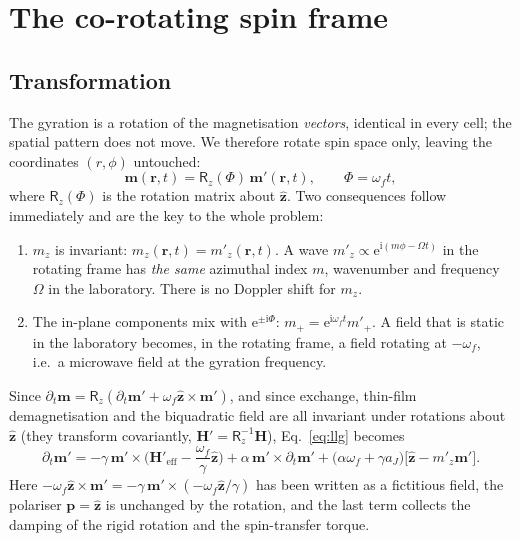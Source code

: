 \documentclass[11pt,a4paper]{article}
\newcommand{\vect}[1]{\mathbf{#1}}
\newcommand{\uv}[1]{\hat{\mathbf{#1}}}
\newcommand{\ee}{\mathrm{e}}
\newcommand{\ii}{\mathrm{i}}
\begin{document}
\section{The co-rotating spin frame}
\label{sec:frame}

\subsection{Transformation}
The gyration is a rotation of the magnetisation \emph{vectors}, identical in every cell; the spatial pattern does
not move.  We therefore rotate spin space only, leaving the coordinates $(r,\phi)$ untouched:
\begin{equation}
\vect m(\vect r,t)=\mathsf R_z(\Phi)\,\vect m'(\vect r,t),\qquad \Phi=\omega_f t,
\label{eq:rot}
\end{equation}
where $\mathsf R_z(\Phi)$ is the rotation matrix about $\uv z$.  Two consequences follow immediately and are the key
to the whole problem:
\begin{enumerate}
\item $m_z$ is invariant: $m_z(\vect r,t)=m'_z(\vect r,t)$.  A wave $m'_z\propto\ee^{\ii(m\phi-\Omega t)}$ in the
rotating frame has \emph{the same} azimuthal index $m$, wavenumber and frequency $\Omega$ in the laboratory.
There is no Doppler shift for $m_z$.
\item The in-plane components mix with $\ee^{\pm\ii\Phi}$: $m_+=\ee^{\ii\omega_f t}m'_+$.  A field that is static in
the laboratory becomes, in the rotating frame, a field rotating at $-\omega_f$, i.e.\ a microwave field at the
gyration frequency.
\end{enumerate}

Since $\partial_t\vect m=\mathsf R_z(\partial_t\vect m'+\omega_f\uv z\times\vect m')$, and since exchange,
thin-film demagnetisation and the biquadratic field are all invariant under rotations about $\uv z$
(they transform covariantly, $\vect H'=\mathsf R_z^{-1}\vect H$), Eq.~\eqref{eq:llg} becomes
\begin{equation}
\partial_t\vect m'=-\gamma\,\vect m'\times\Big(\vect H'_\mathrm{eff}-\frac{\omega_f}{\gamma}\uv z\Big)
+\alpha\,\vect m'\times\partial_t\vect m'
+\big(\alpha\omega_f+\gamma a_J\big)\big[\uv z-m'_z\vect m'\big].
\label{eq:llgrot}
\end{equation}
Here $-\omega_f\uv z\times\vect m'=-\gamma\,\vect m'\times(-\omega_f\uv z/\gamma)$ has been written as a fictitious
field, the polariser $\vect p=\uv z$ is unchanged by the rotation, and the last term collects the damping of the
rigid rotation and the spin-transfer torque.
\end{document}
